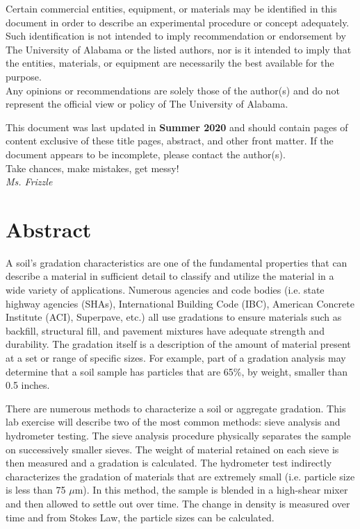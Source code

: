 \documentclass[12pt]{article}
\newcommand{\LastUpdate}{Summer 2020}
\begin{document}
\begin{titlepage}
\begin{center}
\normalsize 
Certain commercial entities, equipment, or materials may be identified in this document in order to describe an experimental procedure or concept adequately. Such identification is not intended to imply recommendation or endorsement by The University of Alabama or the listed authors, nor is it intended to imply that the entities, materials, or equipment are necessarily the best available for the purpose.\\
\vfill
Any opinions or recommendations are solely those of the author(s) and do not represent the official view or policy of The University of Alabama.
\end{center}
\begin{flushright}
\vfill
\normalsize 
This document was last updated in \textbf{\LastUpdate} and should contain \textbf{\pageref{LastPage}} pages of content exclusive of these title pages, abstract, and other front matter. If the document appears to be incomplete, please contact the author(s).\\
\vfill
Take chances, make mistakes, get messy!\\
\textit{Ms. Frizzle}
\end{flushright}
\end{titlepage}
\section*{Abstract}
\normalsize A soil's gradation characteristics are one of the fundamental properties that can describe a material in sufficient detail to classify and utilize the material in a wide variety of applications. Numerous agencies and code bodies (i.e. state highway agencies (SHAs), International Building Code (IBC), American Concrete Institute (ACI), Superpave, etc.) all use gradations to ensure materials such as backfill, structural fill, and pavement mixtures have adequate strength and durability. The gradation itself is a description of the amount of material present at a set or range of specific sizes. For example, part of a gradation analysis may determine that a soil sample has particles that are 65\%, by weight, smaller than 0.5 inches.

There are numerous methods to characterize a soil or aggregate gradation. This lab exercise will describe two of the most common methods: sieve analysis and hydrometer testing. The sieve analysis procedure physically separates the sample on successively smaller sieves. The weight of material retained on each sieve is then measured and a gradation is calculated. The hydrometer test indirectly characterizes the gradation of materials that are extremely small (i.e. particle size is less than 75 $\mu$m). In this method, the sample is blended in a high-shear mixer and then allowed to settle out over time. The change in density is measured over time and from Stokes Law, the particle sizes can be calculated.\\
\end{document}
